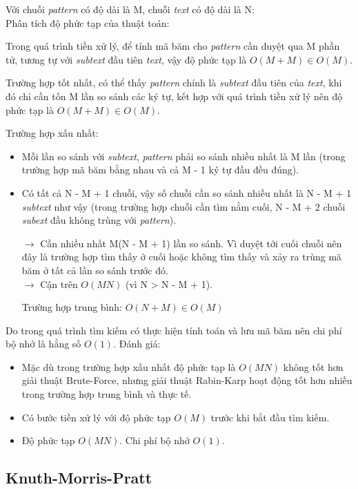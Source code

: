 \documentclass[a4paper,11pt]{article}
\begin{document}
			Với chuỗi \textit{pattern} có độ dài là M, chuỗi \textit{text} có độ dài là N: \\
			Phân tích độ phức tạp của thuật toán:

				Trong quá trình tiền xử lý, để tính mã băm cho \textit{pattern} cần duyệt qua M phần tử, tương tự với \textit{subtext} đầu tiên \textit{text}, vậy độ phức tạp là $O(M+M) \in O(M)$.

				Trường hợp tốt nhất, có thể thấy \textit{pattern} chính là \textit{subtext} đầu tiên của \textit{text}, khi đó chỉ cần tốn M lần so sánh các ký tự, kết hợp với quá trình tiền xử lý nên độ phức tạp là $O(M+M) \in O(M)$.

				Trường hợp xấu nhất:
			\begin{itemize}
				\item Mỗi lần so sánh với \textit{subtext}, \textit{pattern} phải so sánh nhiều nhất là M lần (trong trường hợp mã băm bằng nhau và cả M - 1 ký tự đầu đều đúng).
				\item Có tất cả N - M + 1 chuỗi, vậy số chuỗi cần so sánh nhiều nhất là N - M + 1 \textit{subtext} như vậy (trong trường hợp chuỗi cần tìm nằm cuối, N - M + 2 chuỗi \textit{subext} đầu không trùng với \textit{pattern}).
				
				$\to$ Cần nhiều nhất M(N - M + 1) lần so sánh. Vì duyệt tới cuối chuỗi nên đây là trường hợp tìm thấy ở cuối hoặc không tìm thấy và xảy ra trùng mã băm ở tất cả lần so sánh trước đó.\\
				$\to$ Cận trên $O(MN)$ (vì N > N - M + 1). 
				
				Trường hợp trung bình: $O(N+M) \in O(M)$
			\end{itemize}
				Do trong quá trình tìm kiếm có thực hiện tính toán và lưu mã băm nên chi phí bộ nhớ là hằng số $O(1)$.
			Đánh giá:
			\begin{itemize}
				\item Mặc dù trong trường hợp xấu nhất độ phức tạp là $O(MN)$ không tốt hơn giải thuật Brute-Force, nhưng giải thuật Rabin-Karp hoạt động tốt hơn nhiều trong trường hợp trung bình và thực tế.
				\item Có bước tiền xử lý với độ phức tạp $O(M)$ trước khi bắt đầu tìm kiếm.
				\item Độ phức tạp $O(MN)$. Chi phí bộ nhớ $O(1)$.
			\end{itemize}
		\subsection {Knuth-Morris-Pratt}
		
\end{document}
